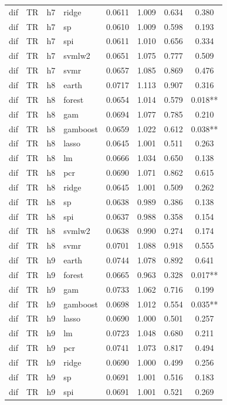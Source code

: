 \begin{ThreePartTable}
\begin{longtable}[t]{llclcccc}
dif & TR & h7 & ridge & 0.0611 & 1.009 & 0.634 & 0.380\\
dif & TR & h7 & sp & 0.0610 & 1.009 & 0.598 & 0.193\\
dif & TR & h7 & spi & 0.0611 & 1.010 & 0.656 & 0.334\\
dif & TR & h7 & svmlw2 & 0.0651 & 1.075 & 0.777 & 0.509\\
dif & TR & h7 & svmr & 0.0657 & 1.085 & 0.869 & 0.476\\
\addlinespace
dif & TR & h8 & earth & 0.0717 & 1.113 & 0.907 & 0.316\\
dif & TR & h8 & forest & 0.0654 & 1.014 & 0.579 & 0.018**\\
dif & TR & h8 & gam & 0.0694 & 1.077 & 0.785 & 0.210\\
dif & TR & h8 & gamboost & 0.0659 & 1.022 & 0.612 & 0.038**\\
dif & TR & h8 & lasso & 0.0645 & 1.001 & 0.511 & 0.263\\
dif & TR & h8 & lm & 0.0666 & 1.034 & 0.650 & 0.138\\
dif & TR & h8 & pcr & 0.0690 & 1.071 & 0.862 & 0.615\\
dif & TR & h8 & ridge & 0.0645 & 1.001 & 0.509 & 0.262\\
dif & TR & h8 & sp & 0.0638 & 0.989 & 0.386 & 0.138\\
dif & TR & h8 & spi & 0.0637 & 0.988 & 0.358 & 0.154\\
dif & TR & h8 & svmlw2 & 0.0638 & 0.990 & 0.274 & 0.174\\
dif & TR & h8 & svmr & 0.0701 & 1.088 & 0.918 & 0.555\\
\addlinespace
dif & TR & h9 & earth & 0.0744 & 1.078 & 0.892 & 0.641\\
dif & TR & h9 & forest & 0.0665 & 0.963 & 0.328 & 0.017**\\
dif & TR & h9 & gam & 0.0733 & 1.062 & 0.716 & 0.199\\
dif & TR & h9 & gamboost & 0.0698 & 1.012 & 0.554 & 0.035**\\
dif & TR & h9 & lasso & 0.0690 & 1.000 & 0.501 & 0.257\\
dif & TR & h9 & lm & 0.0723 & 1.048 & 0.680 & 0.211\\
dif & TR & h9 & pcr & 0.0741 & 1.073 & 0.817 & 0.494\\
dif & TR & h9 & ridge & 0.0690 & 1.000 & 0.499 & 0.256\\
dif & TR & h9 & sp & 0.0691 & 1.001 & 0.516 & 0.183\\
dif & TR & h9 & spi & 0.0691 & 1.001 & 0.521 & 0.269\\

\end{longtable}
\end{ThreePartTable}
